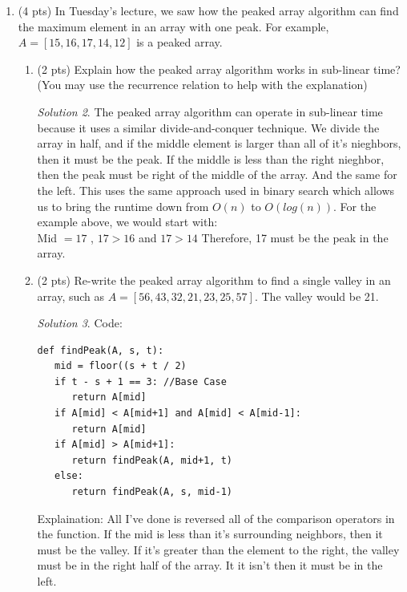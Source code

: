 \documentclass[12pt]{article}
\theoremstyle{remark}
\newtheorem*{solution}{Solution}
\begin{document}
\begin{enumerate}
\begin{solution}
\end{solution}
\pagebreak
\item (4 pts) In Tuesday's lecture, we saw how the peaked array algorithm can find the maximum element in an array with one peak. For example, $A=[15, 16, 17, 14, 12]$ is a peaked array.
\begin{enumerate}[label=(\alph*)]
\item (2 pts) Explain how the peaked array algorithm works in sub-linear time? 
(You may use the recurrence relation to help with the explanation)
\begin{solution}
The peaked array algorithm can operate in sub-linear time because it uses a similar divide-and-conquer technique. We divide the array in half, and if the middle element is larger than all of it's nieghbors, then it must be the peak. If the middle is less than the right nieghbor, then the peak must be right of the middle of the array. And the same for the left. This uses the same approach used in binary search which allows us to bring the runtime down from $O(n)$ to $O(log(n))$. For the example above, we would start with:
\\Mid $= 17$ ,  $17 > 16 $ and  $17 > 14$ Therefore, 17 must be the peak in the array.
\end{solution}

\item (2 pts) Re-write the peaked array algorithm to find a single valley in an array, such as $A=[56, 43, 32, 21, 23, 25, 57]$. The valley would be 21.
\begin{solution}Code: 
\begin{verbatim}
def findPeak(A, s, t):
   mid = floor((s + t / 2)
   if t - s + 1 == 3: //Base Case
      return A[mid]
   if A[mid] < A[mid+1] and A[mid] < A[mid-1]:
      return A[mid]
   if A[mid] > A[mid+1]:
      return findPeak(A, mid+1, t)
   else:
      return findPeak(A, s, mid-1)
\end{verbatim}
Explaination: All I've done is reversed all of the comparison operators in the function. If the mid is less than it's surrounding neighbors, then it must be the valley. If it's greater than the element to the right, the valley must be in the right half of the array. It it isn't then it must be in the left.
\end{solution}

\end{enumerate}

\end{enumerate}
\end{document}
